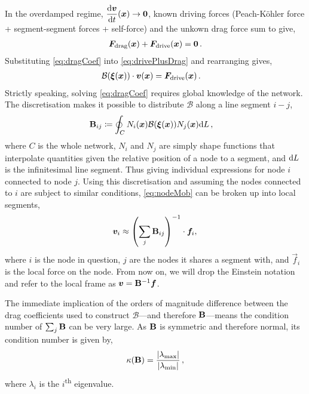 In the overdamped regime, $\dfrac{\rvar{d}\vec{v}}{\rvar{d}t}(\vec{x}) \to \vec{0}$, known driving forces (Peach-K\"{o}hler force + segment-segment forces + self-force) and the unkown drag force sum to give,
\begin{align}\label{eq:drivePlusDrag}
    \vec{F}_\rvar{drag}(\vec{x}) + \vec{F}_\rvar{drive}(\vec{x}) = \vec{0}\,.
\end{align}
Substituting \cref{eq:dragCoef} into \cref{eq:drivePlusDrag} and rearranging gives,
\begin{align}\label{eq:nodeMob}
    \mathcal{B}(\vec{\xi}(\vec{x})) \cdot \vec{v}(\vec{x}) & = \vec{F}_\rvar{drive}(\vec{x})\,.
\end{align}
Strictly speaking, solving \cref{eq:dragCoef} requires global knowledge of the network. The discretisation makes it possible to distribute $\mathcal{B}$ along a line segment $i-j$,
\begin{align}\label{eq:dragMatrix}
    \mtx{B}_{ij} & \coloneqq \oint_{C} N_i(\vec{x}) \mathcal{B}(\vec{\xi}(\vec{x})) N_j(\vec{x}) \rvar{d}L\,,
\end{align}
where $C$ is the whole network, $N_i$ and $N_j$ are simply shape functions that interpolate quantities given the relative position of a node to a segment, and $\textrm{d}L$ is the infinitesimal line segment. Thus giving individual expressions for node $i$ connected to node $j$. Using this discretisation and assuming the nodes connected to $i$ are subject to similar conditions, \cref{eq:nodeMob} can be broken up into local segments,
\begin{align}\label{eq:nodeVel}
    \vec{v}_i \approx \left(\sum\limits_j \mtx{B}_{ij}\right)^{-1} \cdot \vec{f}_i,\,
\end{align}
where $i$ is the node in question, $j$ are the nodes it shares a segment with, and $\vec{f}_i$ is the local force on the node. From now on, we will drop the Einstein notation and refer to the local frame as $\vec{v} = \mtx{B}^{-1} \vec{f}$.

The immediate implication of the orders of magnitude difference between the drag coefficients used to construct $\mathcal{B}$---and therefore $\mathbf{B}$---means the condition number of $\sum_j \mathbf{B}$ can be very large. As $\mathbf{B}$ is symmetric and therefore normal, its condition number is given by,
\begin{align}\label{eq:conditionNumb}
    \kappa(\mathbf{B}) = \dfrac{\lvert \lambda_{\textrm{max}} \rvert}{\lvert \lambda_{\textrm{min}} \rvert} \,,
\end{align}
where $\lambda_i$ is the $i$\textsuperscript{th} eigenvalue.

